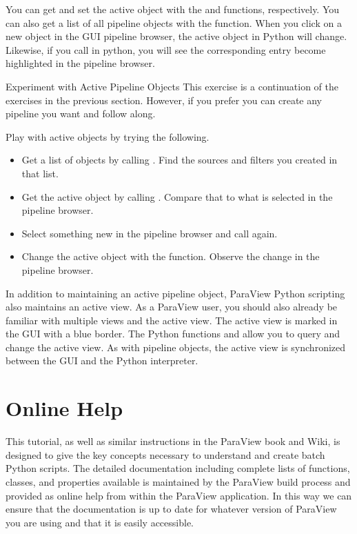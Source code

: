You can get and set the active object with the  and
 functions, respectively.  You can also get a list
of all pipeline objects with the  function.  When you
click on a new object in the GUI pipeline browser, the active object in
Python will change.  Likewise, if you call  in
python, you will see the corresponding entry become highlighted in the
pipeline browser.

\begin{exercise}{Experiment with Active Pipeline Objects}
  \label{ex:ExperimentWithActivePipelineObjects}%
  This exercise is a continuation of the exercises in the previous
  section.  However, if you prefer you can create any pipeline you want and
  follow along.

  Play with active objects by trying the following.
  \begin{itemize}
  \item Get a list of objects by calling
    .  Find the sources and
    filters you created in that list.
  \item Get the active object by calling
    .  Compare that
    to what is selected in the pipeline browser.
  \item Select something new in the pipeline browser and call
     again.
  \item Change the active object with the 
    function.  Observe the change in the pipeline browser.
  \end{itemize}
\end{exercise}

In addition to maintaining an active pipeline object, ParaView Python
scripting also maintains an active view.  As a ParaView user, you should
also already be familiar with multiple views and the active view.  The
active view is marked in the GUI with a blue border.  The Python functions
 and  allow you to query and
change the active view.  As with pipeline objects, the active view is
synchronized between the GUI and the Python interpreter.


\section{Online Help}
\label{sec:OnlineHelp}

This tutorial, as well as similar instructions in the ParaView book and
Wiki, is designed to give the key concepts necessary to understand and
create batch Python scripts.  The detailed documentation including complete lists of
functions, classes, and properties available is maintained by the ParaView
build process and provided as online help from within the ParaView
application.  In this way we can ensure that the documentation is up to
date for whatever version of ParaView you are using and that it is easily
accessible.

